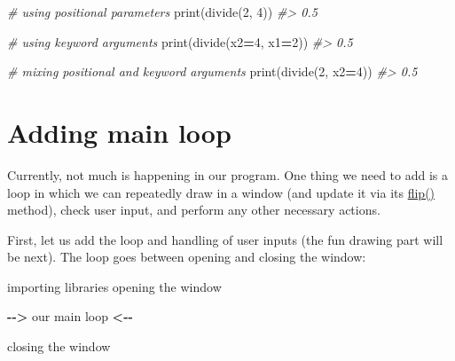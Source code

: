 \documentclass[
]{book}
\newenvironment{Shaded}{\begin{snugshade}}{\end{snugshade}}
\newcommand{\BuiltInTok}[1]{#1}
\newcommand{\CommentTok}[1]{\textcolor[rgb]{0.56,0.35,0.01}{\textit{#1}}}
\newcommand{\DecValTok}[1]{\textcolor[rgb]{0.00,0.00,0.81}{#1}}
\newcommand{\NormalTok}[1]{#1}
\newcommand{\OperatorTok}[1]{\textcolor[rgb]{0.81,0.36,0.00}{\textbf{#1}}}
\begin{document}
\begin{Shaded}
\begin{Highlighting}[]
\CommentTok{\# using positional parameters}
\BuiltInTok{print}\NormalTok{(divide(}\DecValTok{2}\NormalTok{, }\DecValTok{4}\NormalTok{))}
\CommentTok{\#\textgreater{} 0.5}
\end{Highlighting}
\end{Shaded}

\begin{Shaded}
\begin{Highlighting}[]
\CommentTok{\# using keyword arguments}
\BuiltInTok{print}\NormalTok{(divide(x2}\OperatorTok{=}\DecValTok{4}\NormalTok{, x1}\OperatorTok{=}\DecValTok{2}\NormalTok{))}
\CommentTok{\#\textgreater{} 0.5}
\end{Highlighting}
\end{Shaded}

\begin{Shaded}
\begin{Highlighting}[]
\CommentTok{\# mixing positional and keyword arguments}
\BuiltInTok{print}\NormalTok{(divide(}\DecValTok{2}\NormalTok{, x2}\OperatorTok{=}\DecValTok{4}\NormalTok{))}
\CommentTok{\#\textgreater{} 0.5}
\end{Highlighting}
\end{Shaded}

\hypertarget{adding-main-loop}{%
\section{Adding main loop}\label{adding-main-loop}}

Currently, not much is happening in our program. One thing we need to add is a loop in which we can repeatedly draw in a window (and update it via its \href{https://psychopy.org/api/visual/window.html\#psychopy.visual.Window.flip}{flip()} method), check user input, and perform any other necessary actions.

First, let us add the loop and handling of user inputs (the fun drawing part will be next). The loop goes between opening and closing the window:

\begin{Shaded}
\begin{Highlighting}[]
\NormalTok{importing libraries}
\NormalTok{opening the window}

\OperatorTok{{-}{-}\textgreater{}}\NormalTok{ our main loop }\OperatorTok{\textless{}{-}{-}}

\NormalTok{closing the window}
\end{Highlighting}
\end{Shaded}
\end{document}
